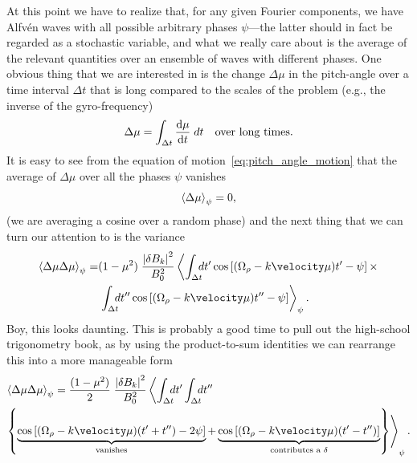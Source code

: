 At this point we have to realize that, for any given Fourier components, we have
Alfv\'en waves with all possible arbitrary phases $\psi$---the latter should in fact
be regarded as a stochastic variable, and what we really care about is the
average of the relevant quantities over an ensemble of waves with different phases.
One obvious thing that we are interested in is the change $\Delta \mu$ in the
pitch-angle over a time interval $\Delta t$ that is long compared to the scales of the
problem (e.g., the inverse of the gyro-frequency)
\begin{align*}
  \Delta \mu = \int_{\Delta t} \dv{\mu}{t} \;d{t} \quad\text{over long times}.
\end{align*}
It is easy to see from the equation of motion~\eqref{eq:pitch_angle_motion} that the
average of $\Delta \mu$ over all the phases $\psi$ vanishes
\begin{align}\label{eq:pitch_angle_mean}
  \left<\Delta \mu\right>_\psi = 0,
\end{align}
(we are averaging a cosine over a random phase) and the next thing that we can turn
our attention to is the variance
\begin{align*}
  \ave{\Delta \mu \Delta \mu}_\psi = &
  (1 - \mu^2) \; \frac{\abs{\delta B_k}^2}{B_0^2}
  \left<
    \int_{\Delta t} \!\!\!\!\!
    \diff{t'} \cos \left[ (\Omega_\gyrorad - k\velocity\mu) t' - \psi \right]
    \times\right. \\
    & \left. \int_{\Delta t} \!\!\!\!\!
    \diff{t''} \cos \left[ (\Omega_\gyrorad - k\velocity\mu) t'' - \psi \right]
  \right>_\psi.
\end{align*}
Boy, this looks daunting. This is probably a good time to pull out the high-school
trigonometry book, as by using the product-to-sum identities
we can rearrange this into a more manageable form
\begin{align*}
  \ave{\Delta \mu \Delta \mu}_\psi =
  \frac{(1 - \mu^2)}{2} \; \frac{\abs{\delta B_k}^2}{B_0^2}
  \left<
  \int_{\Delta t} \!\!\!\!\!
  \diff{t'} \int_{\Delta t} \!\!\!\!\!
  \diff{t''}   \right. & \\
  & \hspace*{-190pt} \left. \left\{
    \underbrace{\cos \left[ (\Omega_\gyrorad - k\velocity\mu) (t' + t'') - 2\psi \right]}_{\text{vanishes}} +
    \underbrace{\cos \left[ (\Omega_\gyrorad - k\velocity\mu) (t' - t'') \right]}_{\text{contributes a }\delta}
  \right\} \right>_\psi.
\end{align*}
